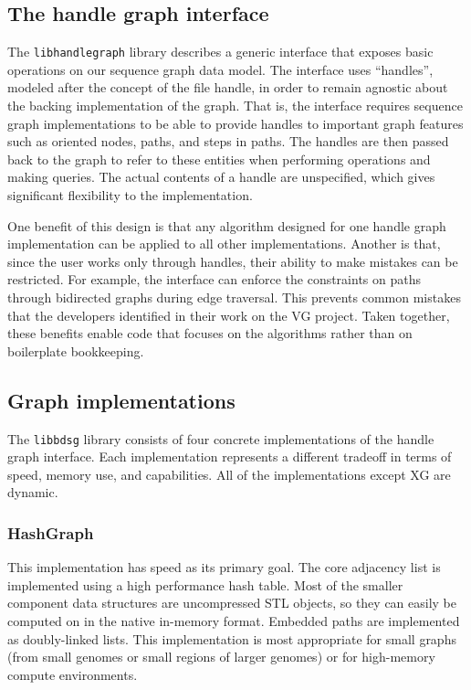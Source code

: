\documentclass{article}
\begin{document}
\subsection{The handle graph interface}

The \texttt{libhandlegraph} library describes a generic interface that exposes basic operations on our sequence graph data model.
The interface uses ``handles'', modeled after the concept of the file handle, in order to remain agnostic about the backing implementation of the graph.
That is, the interface requires sequence graph implementations to be able to provide handles to important graph features such as oriented nodes, paths, and steps in paths.
The handles are then passed back to the graph to refer to these entities when performing operations and making queries.
The actual contents of a handle are unspecified, which gives significant flexibility to the implementation.

One benefit of this design is that any algorithm designed for one handle graph implementation can be applied to all other implementations.
Another is that, since the user works only through handles, their ability to make mistakes can be restricted.
For example, the interface can enforce the constraints on paths through bidirected graphs during edge traversal.
This prevents common mistakes that the developers identified in their work on the VG project.
Taken together, these benefits enable code that focuses on the algorithms rather than on boilerplate bookkeeping.

\subsection{Graph implementations}

The \texttt{libbdsg} library consists of four concrete implementations of the handle graph interface.
Each implementation represents a different tradeoff in terms of speed, memory use, and capabilities.
All of the implementations except XG are dynamic.

\subsubsection{HashGraph}

This implementation has speed as its primary goal.
The core adjacency list is implemented using a high performance hash table.
Most of the smaller component data structures are uncompressed STL objects, so they can easily be computed on in the native in-memory format.
Embedded paths are implemented as doubly-linked lists.
This implementation is most appropriate for small graphs (from small genomes or small regions of larger genomes) or for high-memory compute environments.
\end{document}
